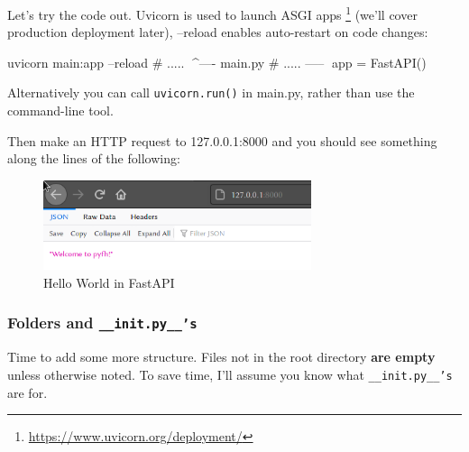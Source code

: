 \documentclass[14pt]{extarticle}
\newcommand{\flink}[1]{\footnote{\href{#1}{#1}}}
\begin{document}
Let's try the code out. Uvicorn is used to launch ASGI apps \flink{https://www.uvicorn.org/deployment/} (we'll cover production deployment later), --reload enables auto-restart on code changes:

\begin{bashcode}
    uvicorn main:app --reload
    # ..... ^^^^---- main.py
    # ..... -----^^^ app = FastAPI()
\end{bashcode}

Alternatively you can call \texttt{uvicorn.run()} in main.py, rather than use the command-line tool.

Then make an HTTP request to 127.0.0.1:8000 and you should see something along the lines of the following:

\begin{figure}[h]
    \centering
    \includegraphics[width=0.7\textwidth]{img/helloworld.png}
    \caption{Hello World in FastAPI}
\end{figure}

\subsubsection{Folders and \texttt{\_\_init.py\_\_'s}}

Time to add some more structure. Files not in the root directory \textbf{are empty} unless otherwise noted. To save time, I'll assume you know what \texttt{\_\_init.py\_\_'s} are for.
\end{document}
